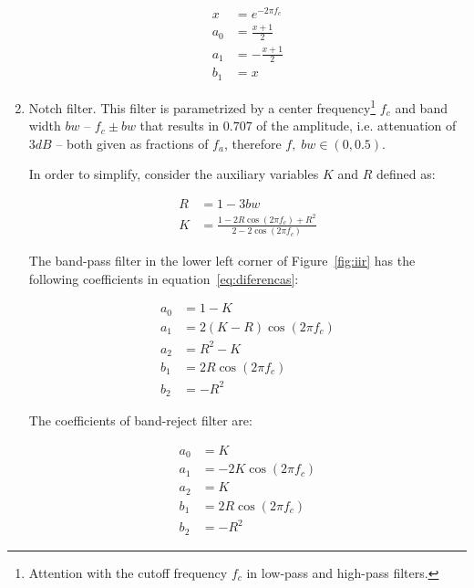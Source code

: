 \documentclass[
 aip,
 jmp,
 amsmath,amssymb,
 reprint,
]{revtex4-1}
\begin{document}
\begin{enumerate}
\begin{equation}\label{eq:passa-altas}
 \begin{split}
 x & =e^{-2\pi f_c} \\
 a_0 & =  \frac{x+1}{2} \\
 a_1 & =  -\frac{x+1}{2} \\
 b_1 & =  x
 \end{split}
\end{equation}


\item Notch filter. This filter is parametrized by a center frequency\footnote{Attention with the cutoff frequency $f_c$ in low-pass and high-pass filters.} $f_c$ and band width $bw$ -- $f_c \pm bw$ that results in $0.707$ of the amplitude, i.e. attenuation of $3dB$ -- both given as fractions of $f_a$, therefore $f,\; bw \in (0,0.5)$.

In order to simplify, consider the auxiliary variables $K$ and $R$ defined as:

\begin{equation}\label{eq:varAux}
 \begin{split}
  R & = 1 - 3bw \\
  K & = \frac{1-2R\cos(2\pi f_c) + R^2}{2 - 2 \cos (2 \pi f_c)}
 \end{split}
\end{equation}

The band-pass filter in the lower left corner of Figure~\ref{fig:iir} has the following coefficients in equation~\ref{eq:diferencas}:

\begin{equation}\label{eq:passa-banda}
 \begin{split}
 a_0 & =  1 - K \\
 a_1 & =  2(K-R)\cos (2\pi f_c) \\
 a_2 & =  R^2-K \\
 b_1 & =  2R \cos (2\pi f_c) \\
 b_2 & =  -R^2
 \end{split}
\end{equation}

The coefficients of band-reject filter are:

\begin{equation}\label{eq:rejeita-banda}
 \begin{split}
 a_0 & =  K \\
 a_1 & =  -2K\cos (2\pi f_c) \\
 a_2 & =  K \\
 b_1 & =  2R \cos (2\pi f_c) \\
 b_2 & =  -R^2
\end{split}
\end{equation}


\end{enumerate}
\end{document}
